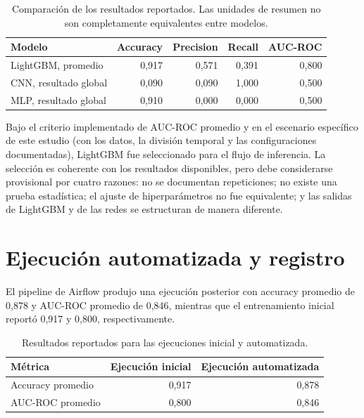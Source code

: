 \begin{table}[H]
    \centering
    \begin{tabular}{|l|r|r|r|r|}
    \hline
    \textbf{Modelo} & \textbf{Accuracy} & \textbf{Precision} & \textbf{Recall} & \textbf{AUC-ROC} \\
    \hline
    LightGBM, promedio & 0,917 & 0,571 & 0,391 & 0,800 \\
    \hline
    CNN, resultado global & 0,090 & 0,090 & 1,000 & 0,500 \\
    \hline
    MLP, resultado global & 0,910 & 0,000 & 0,000 & 0,500 \\
    \hline
    \end{tabular}
    \caption{Comparación de los resultados reportados. Las unidades de resumen no son completamente equivalentes entre modelos.}
    \label{tab:comparacion}
    \end{table}

Bajo el criterio implementado de AUC-ROC promedio y en el escenario específico de este estudio (con los datos, la división temporal y las configuraciones documentadas), LightGBM fue seleccionado para el flujo de inferencia. La selección es coherente con los resultados disponibles, pero debe considerarse provisional por cuatro razones: no se documentan repeticiones; no existe una prueba estadística; el ajuste de hiperparámetros no fue equivalente; y las salidas de LightGBM y de las redes se estructuran de manera diferente.

\section{Ejecución automatizada y registro}

El pipeline de Airflow produjo una ejecución posterior con accuracy promedio de 0,878 y AUC-ROC promedio de 0,846, mientras que el entrenamiento inicial reportó 0,917 y 0,800, respectivamente.

\begin{table}[H]
    \centering
    \begin{tabular}{|l|r|r|}
    \hline
    \textbf{Métrica} & \textbf{Ejecución inicial} & \textbf{Ejecución automatizada} \\
    \hline
        Accuracy promedio & 0,917 & 0,878 \\
    \hline
        AUC-ROC promedio & 0,800 & 0,846 \\
    \hline
    \end{tabular}
    \caption{Resultados reportados para las ejecuciones inicial y automatizada.}
    \label{tab:inicial_vs_final}
\end{table}

